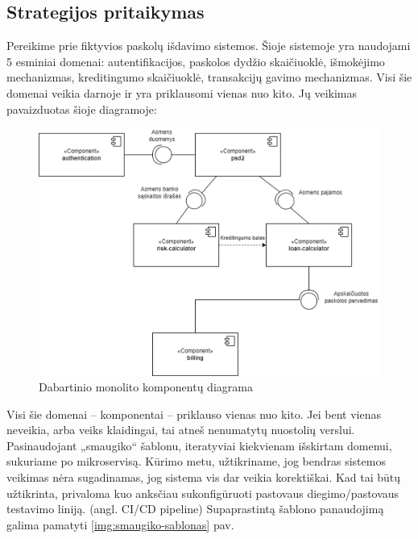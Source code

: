 \documentclass[fleqn]{VUMIFPSkursinis}
\begin{document}
\subsection{Strategijos pritaikymas}
Pereikime prie fiktyvios paskolų išdavimo sistemos. Šioje sistemoje yra naudojami 5 esminiai domenai: autentifikacijos, paskolos dydžio skaičiuoklė, išmokėjimo mechanizmas, kreditingumo skaičiuoklė, transakcijų gavimo mechanizmas. Visi šie domenai veikia darnoje ir yra priklausomi vienas nuo kito. Jų veikimas pavaizduotas šioje diagramoje:
\begin{figure}[H]
    \centering
    \includegraphics[scale=1.0]{img/komponentu-diagrama.png}
    \caption{Dabartinio monolito komponentų diagrama}
    \label{img:komponentu-diagrama}
\end{figure}

Visi šie domenai – komponentai – priklauso vienas nuo kito. Jei bent vienas neveikia, arba veiks klaidingai, tai atneš nenumatytų nuostolių verslui. Pasinaudojant „smaugiko“ šablonu, iteratyviai kiekvienam išskirtam domenui, sukuriame po mikroservisą. Kūrimo metu, užtikriname, jog bendras sistemos veikimas nėra sugadinamas, jog sistema vis dar veikia korektiškai. Kad tai būtų užtikrinta, privaloma kuo anksčiau sukonfigūruoti pastovaus diegimo/pastovaus testavimo liniją. (angl. CI/CD pipeline)  Supaprastintą šablono panaudojimą galima pamatyti \ref{img:smaugiko-sablonas} pav.
\end{document}

